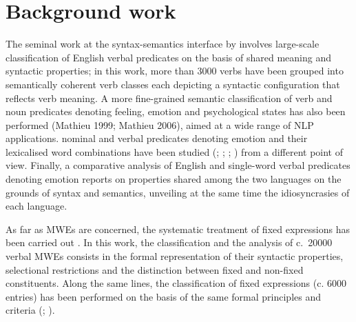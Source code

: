 \documentclass[output=paper]{langsci/langscibook}
\begin{document}
\section{Background work}



The seminal work at the syntax-semantics interface by \citet{levin1993} involves large-scale
classification of English verbal predicates on the basis
of shared meaning and syntactic properties; in this work, more than
3000 verbs have been grouped into semantically coherent verb classes each
depicting a syntactic configuration that reflects verb meaning. A more
fine-grained semantic classification of  verb and noun predicates
denoting feeling, emotion and psychological states has also been
performed (Mathieu 1999; Mathieu 2006), aimed at a wide range of NLP
applications.  nominal and verbal
predicates denoting emotion and their lexicalised word combinations
have been studied (\citealt{leeman1991}; \citealt{gross1995locale}; \citealt{balibar1995}; \citealt{tutin2006})  from a different point of view. Finally, a comparative analysis of English and 
single-word verbal predicates denoting emotion \citep{mathieu2010} reports on properties shared among the two languages on the
grounds of syntax and semantics, unveiling at the same time the
idiosyncrasies of each language. 



As far as MWEs are concerned, the systematic treatment of  fixed
expressions has been carried out \citep{gross1982}.  In this work, the
classification and the analysis of c.\ 20000  verbal MWEs consists in
the formal representation of their syntactic properties, selectional
restrictions and the distinction between fixed and non-fixed
constituents. Along the same lines, the classification of  fixed
expressions (c. 6000 entries) has been performed on the basis of the
same formal principles and criteria (\citealt{fotopoulou1993}; \citealt{Mini2009}).
\end{document}
